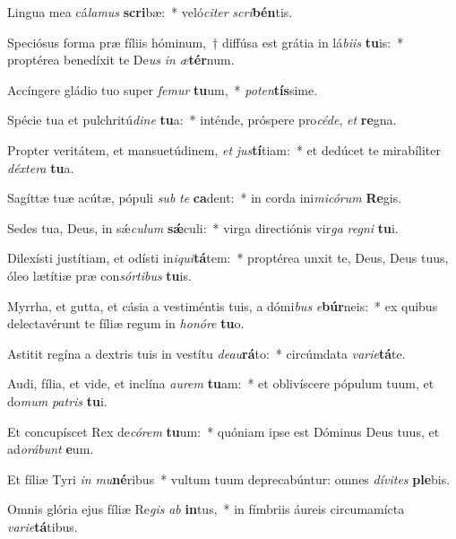 \item Lingua mea cá\textit{la}\textit{mus} \textbf{scri}bæ:~* veló\textit{ci}\textit{ter} \textit{scri}\textbf{bén}tis.
\item Speciósus forma præ fíliis hóminum,~† diffúsa est grátia in lá\textit{bi}\textit{is} \textbf{tu}is:~* proptérea benedíxit te De\textit{us} \textit{in} \textit{æ}\textbf{tér}num.
\item Accíngere gládio tuo super \textit{fe}\textit{mur} \textbf{tu}um,~* \textit{pot}\textit{en}\textbf{tís}sime.
\item Spécie tua et pulchritú\textit{di}\textit{ne} \textbf{tu}a:~* inténde, próspere pro\textit{cé}\textit{de}, \textit{et} \textbf{re}gna.
\item Propter veritátem, et mansuetúdinem, \textit{et} \textit{jus}\textbf{tí}tiam:~* et dedúcet te mirabíliter \textit{déx}\textit{te}\textit{ra} \textbf{tu}a.
\item Sagíttæ tuæ acútæ, pópuli \textit{sub} \textit{te} \textbf{ca}dent:~* in corda ini\textit{mi}\textit{có}\textit{rum} \textbf{Re}gis.
\item Sedes tua, Deus, in sǽ\textit{cu}\textit{lum} \textbf{sǽ}culi:~* virga directiónis vir\textit{ga} \textit{re}\textit{gni} \textbf{tu}i.
\item Dilexísti justítiam, et odísti in\textit{i}\textit{qui}\textbf{tá}tem:~* proptérea unxit te, Deus, Deus tuus, óleo lætítiæ præ con\textit{sór}\textit{ti}\textit{bus} \textbf{tu}is.
\item Myrrha, et gutta, et cásia a vestiméntis tuis, a dómi\textit{bus} \textit{e}\textbf{búr}neis:~* ex quibus delectavérunt te fíliæ regum in \textit{ho}\textit{nó}\textit{re} \textbf{tu}o.
\item Astitit regína a dextris tuis in vestítu \textit{de}\textit{au}\textbf{rá}to:~* circúmdata \textit{va}\textit{ri}\textit{e}\textbf{tá}te.
\item Audi, fília, et vide, et inclína \textit{au}\textit{rem} \textbf{tu}am:~* et oblivíscere pópulum tuum, et do\textit{mum} \textit{pa}\textit{tris} \textbf{tu}i.
\item Et concupíscet Rex de\textit{có}\textit{rem} \textbf{tu}um:~* quóniam ipse est Dóminus Deus tuus, et ad\textit{o}\textit{rá}\textit{bunt} \textbf{e}um.
\item Et fíliæ Tyri \textit{in} \textit{mu}\textbf{né}ribus~* vultum tuum deprecabúntur: omnes \textit{dí}\textit{vi}\textit{tes} \textbf{ple}bis.
\item Omnis glória ejus fíliæ Re\textit{gis} \textit{ab} \textbf{in}tus,~* in fímbriis áureis circumamícta \textit{va}\textit{ri}\textit{e}\textbf{tá}tibus.
